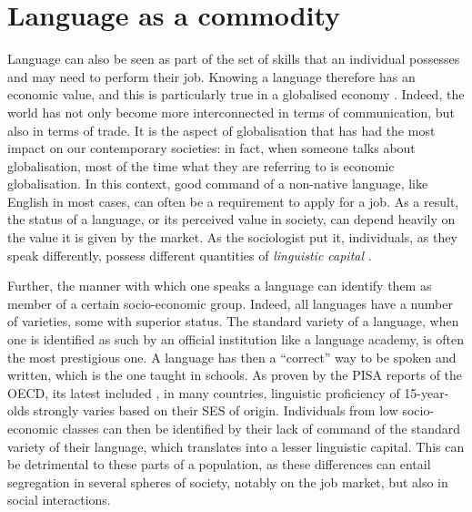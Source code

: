 \documentclass[../thesis.tex]{subfiles}
\begin{document}
\section{Language as a commodity}
Language can also be seen as part of the set of skills that an individual possesses and
may need to perform their job. Knowing a language therefore has an economic value, and
this is particularly true in a globalised economy
\cite{HellerCommodificationLanguage2010}. Indeed, the world has not only become more
interconnected in terms of communication, but also in terms of trade. It is the aspect
of globalisation that has had the most impact on our contemporary societies: in fact,
when someone talks about globalisation, most of the time what they are referring to is
economic globalisation. In this context, good command of a non-native language, like
English in most cases, can often be a requirement to apply for a job. As a result, the
status of a language, or its perceived value in society, can depend heavily on the value
it is given by the market. As the sociologist
 put it, individuals, as they speak
differently, possess different quantities of \emph{linguistic capital}
\cite{BourdieuLanguageSymbolic2009}.

Further, the manner with which one speaks a language can identify them as member of a
certain socio-economic group. Indeed, all languages have a number of varieties, some
with superior status. The standard variety of a language, when one is identified as such
by an official institution like a language academy, is often the most prestigious one. A
language has then a ``correct'' way to be spoken and written, which is the one taught in
schools. As proven by the PISA reports of the OECD, its latest included
\cite{OECDWhereAll2019}, in many countries, linguistic proficiency of 15-year-olds
strongly varies based on their \ac{SES} of origin. Individuals from low socio-economic
classes can then be identified by their lack of command of the standard variety of their
language, which translates into a lesser linguistic capital. This can be detrimental to
these parts of a population, as these differences can entail segregation in several
spheres of society, notably on the job market, but also in social interactions. 

\end{document}

